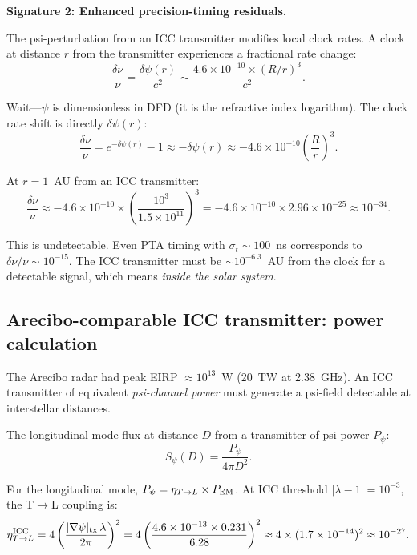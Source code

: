 \documentclass[11pt]{article}
\newcommand{\ee}[1]{\times 10^{#1}}
\begin{document}
\textbf{Signature 2: Enhanced precision-timing residuals.}

The psi-perturbation from an ICC transmitter modifies local clock
rates. A clock at distance $r$ from the transmitter experiences
a fractional rate change:
\begin{equation}
\frac{\delta\nu}{\nu} = \frac{\delta\psi(r)}{c^2} \sim \frac{4.6\ee{-10} \times (R/r)^3}{c^2}.
\end{equation}

Wait---$\psi$ is dimensionless in DFD (it is the refractive index
logarithm). The clock rate shift is directly $\delta\psi(r)$:
\begin{equation}
\frac{\delta\nu}{\nu} = e^{-\delta\psi(r)} - 1 \approx -\delta\psi(r)
\approx -4.6\ee{-10} \left(\frac{R}{r}\right)^3.
\end{equation}

At $r = 1$~AU from an ICC transmitter:
\begin{equation}
\frac{\delta\nu}{\nu} \approx -4.6\ee{-10} \times \left(\frac{10^3}{1.5\ee{11}}\right)^3
= -4.6\ee{-10} \times 2.96\ee{-25} \approx 10^{-34}.
\end{equation}

This is undetectable. Even PTA timing with $\sigma_t \sim 100$~ns
corresponds to $\delta\nu/\nu \sim 10^{-15}$. The ICC transmitter
must be $\sim 10^{-6.3}$~AU from the clock for a detectable signal,
which means \textit{inside the solar system}.

\subsection{Arecibo-comparable ICC transmitter: power calculation}

The Arecibo radar had peak EIRP $\approx 10^{13}$~W (20~TW at
2.38~GHz). An ICC transmitter of equivalent \textit{psi-channel
power} must generate a psi-field detectable at interstellar
distances.

The longitudinal mode flux at distance $D$ from a transmitter
of psi-power $P_\psi$:
\begin{equation}
S_\psi(D) = \frac{P_\psi}{4\pi D^2}.
\end{equation}

For the longitudinal mode, $P_\psi = \eta_{T\to L} \times P_{\rm EM}$.
At ICC threshold $|\lambda-1| = 10^{-3}$, the T$\to$L coupling is:
\begin{equation}
\eta_{T\to L}^{\rm ICC} = 4\left(\frac{|\nabla\psi|_{\rm tx}\,\lambda}{2\pi}\right)^2
= 4\left(\frac{4.6\ee{-13} \times 0.231}{6.28}\right)^2
\approx 4 \times (1.7\ee{-14})^2 \approx 10^{-27}.
\end{equation}
\end{document}
